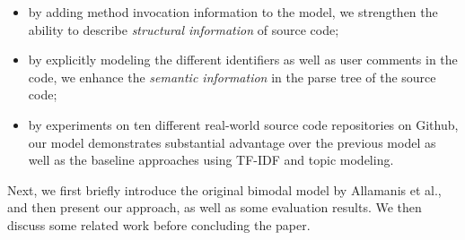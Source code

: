 \begin{itemize}
\item by adding method invocation information to the model,
we strengthen the ability to describe {\em structural information}
of source code;
\item by explicitly modeling the different identifiers as well as user comments
in the code, we enhance the {\em semantic information} in the parse tree of the
source code;
\item by experiments on ten different real-world source code repositories on
Github, our model demonstrates substantial advantage over the previous model
as well as the baseline approaches using TF-IDF and topic modeling.
\end{itemize}

Next, we first briefly introduce the original bimodal model by Allamanis et al.,
and then present our approach, as well as some evaluation results. We then
discuss some related work before concluding the paper.
